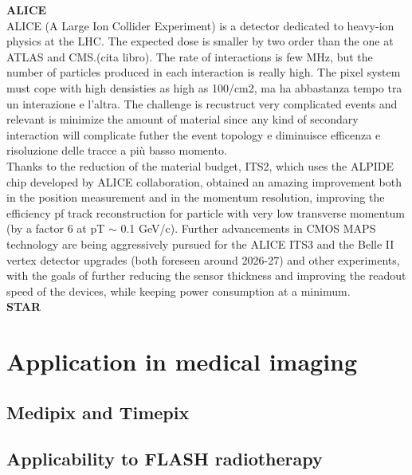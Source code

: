         \textbf{ALICE}\\
        ALICE (A Large Ion Collider Experiment) is a detector dedicated to heavy-ion physics at the LHC.
        The expected dose is smaller by two order than the one at ATLAS and CMS.(cita libro). The rate of interactions is few \si{MHz}, but the number of particles produced in each interaction is really high. The pixel system must cope with high densisties as high as 100/cm2, ma ha abbastanza tempo tra un interazione e l'altra. 
        The challenge is recustruct very complicated events and relevant is minimize the amount of material since any kind of secondary interaction will complicate futher the event topology e diminuisce efficenza e risoluzione delle tracce a più basso momento. \\
        Thanks to the reduction of the material budget, ITS2, which uses the ALPIDE chip developed by ALICE collaboration, obtained an amazing improvement both in the position measurement and in the momentum resolution, improving the efficiency pf track reconstruction for particle with very low transverse momentum (by a factor 6 at pT $\sim$ 0.1 GeV/c). Further advancements in CMOS MAPS technology are being aggressively pursued for the ALICE ITS3 and the Belle II vertex detector upgrades (both foreseen around 2026-27) and other experiments, with the goals of further reducing the sensor thickness and improving the readout speed of the devices, while keeping power consumption at a minimum.\\
        \textbf{STAR}\\

\section{Application in medical imaging}
    \subsection{Medipix and Timepix}
    \subsection{Applicability to FLASH radiotherapy}